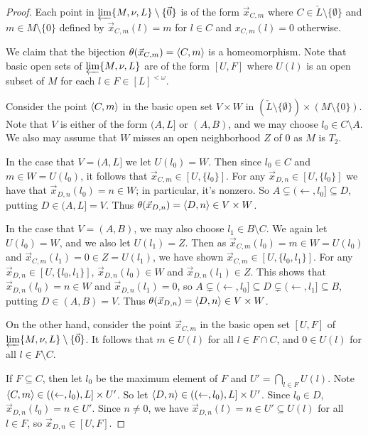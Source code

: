 \documentclass[11pt]{article}
\newcommand{\vect}{\vec}
\begin{document}
  \begin{proof}
    Each point in \(\varprojlim\{M,\nu,L\}\setminus\{\vect 0\}\) is of the
    form \(\vect x_{C,m}\) where \(C\in\check L\setminus\{\emptyset\}\)
    and \(m\in M\setminus\{0\}\) defined by \(\vect x_{C,m}(l)=m\) for \(l\in C\)
    and \(x_{C,m}(l)=0\) otherwise.

    We claim that the bijection \(\theta(\vect x_{C,m})=\<C,m\>\) is a
    homeomorphism. Note that basic open sets of
    \(\varprojlim\{M,\nu,L\}\) are of the form \([U,F]\) where \(U(l)\) is
    an open subset of \(M\) for each \(l\in F\in[L]^{<\omega}\).

    Consider the point \(\langle C,m\rangle\) in the basic open set \(V\times W\) in
    \((\check L\setminus\{\emptyset\})\times(M\setminus\{0\})\). Note that
    \(V\) is either of the form \((A,L]\) or \((A,B)\), and we may choose
    \(l_0\in C\setminus A\). We also may assume that \(W\) misses an open
    neighborhood \(Z\) of \(0\) as \(M\) is \(T_2\).

    In the case that \(V=(A,L]\) we let \(U(l_0)=W\).
    Then since \(l_0\in C\) and \(m\in W=U(l_0)\), it follows that
    \(\vect x_{C,m}\in[U,\{l_0\}]\).
    For any \(\vect x_{D,n}\in[U,\{l_0\}]\) we have that \(\vect x_{D,n}(l_0)=n\in W\);
    in particular, it's nonzero. So
    \(A\subsetneq (\leftarrow,l_0]\subseteq D\), putting \(D\in(A,L]=V\). Thus
    \(\theta(\vect x_{D,n})=\<D,n\>\in V\times W\).

    In the case that \(V=(A,B)\), we may also choose \(l_1\in B\setminus C\).
    We again let \(U(l_0)=W\), and we also let \(U(l_1)=Z\). Then as
    \(\vect x_{C,m}(l_0)=m\in W=U(l_0)\) and
    \(\vect x_{C,m}(l_1)=0\in Z=U(l_1)\), we have shown
    \(\vect x_{C,m}\in[U,\{l_0,l_1\}]\). For any \(\vect x_{D,n}\in[U,\{l_0,l_1\}]\),
    \(\vect x_{D,n}(l_0)\in W\) and \(\vect x_{D,n}(l_1)\in Z\).
    This shows that \(\vect x_{D,n}(l_0)=n\in W\) and \(\vect x_{D,n}(l_1)=0\), so
    \(
      A
        \subsetneq
      (\leftarrow,l_0]
        \subseteq
      D
        \subsetneq
      (\leftarrow,l_1]
        \subseteq
      B
    \), putting \(D\in(A,B)=V\). Thus
    \(\theta(\vect x_{D,n})=\<D,n\>\in V\times W\).

    On the other hand, consider the point \(\vect x_{C,m}\) in the basic
    open set \([U,F]\) of
    \(\varprojlim\{M,\nu,L\}\setminus\{\vect 0\}\).
    It follows that \(m\in U(l)\) for all \(l\in F\cap C\),
    and \(0\in U(l)\) for all \(l\in F\setminus C\).

    If \(F\subseteq C\), then let \(l_0\) be the maximum element of \(F\) and
    \(U'=\bigcap_{l\in F}U(l)\). Note \(\langle C,m\rangle\in((\leftarrow,l_0),L]\times U'\).
    So let \(\langle D,n\rangle\in((\leftarrow,l_0),L]\times U'\). Since \(l_0\in D\),
    \(\vect x_{D,n}(l_0)=n\in U'\). Since \(n\not=0\), we have
    \(\vect x_{D,n}(l)=n\in U'\subseteq U(l)\) for all \(l\in F\), so
    \(\vect x_{D,n}\in[U,F]\).


\end{proof}
\end{document}
